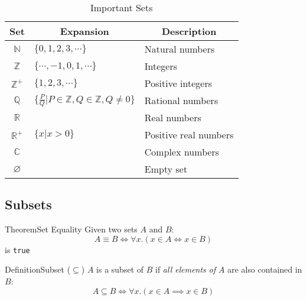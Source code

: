 \documentclass{MathNotes}
\newenvironment{definition}[1]{\begin{RedBox}{Definition}{#1}}{\end{RedBox}}
\newenvironment{theorem}[1]{\begin{GrayBox}{Theorem}{#1}}{\end{GrayBox}}
\begin{document}
\begin{table}[h!]\label{tab:important-sets}
	\centering
	\caption{Important Sets}
	\begin{tabular}{cll}
		\multicolumn{1}{c}{\textbf{Set}}                           &
		\multicolumn{1}{c}{\textbf{Expansion}}                     &
		\multicolumn{1}{c}{\textbf{Description}}                         \\
		\midrule
		$\mathbb{N}$                                               &
		$\{0, 1, 2, 3,\cdots\}$                                    &
		Natural numbers                                                  \\
		$\mathbb{Z}$                                               &
		$\{\cdots,-1,0, 1,\cdots\}$                                &
		Integers                                                         \\
		$\mathbb{Z}^+$                                             &
		$\{1, 2, 3,\cdots\}$                                       &
		Positive integers                                                \\
		$\mathbb{Q}$                                               &
		$\{\frac{P}{Q}\big|P\in\mathbb{Z},Q\in\mathbb{Z},Q\neq0\}$ &
		Rational numbers                                                 \\
		$\mathbb{R}$                                               &   &
		Real numbers                                                     \\
		$\mathbb{R}^+$                                             &
		$\{x\big|x>0\}$                                            &
		Positive real numbers                                            \\
		$\mathbb{C}$                                               &   &
		Complex numbers                                                  \\
		$\varnothing$                                              &   &
		Empty set                                                        \\
	\end{tabular}
\end{table}

\newpage
\subsection{Subsets}
\begin{multicols}{2}
	\begin{theorem}{Set Equality}\label{th:set-equality}
		Given two sets $A$ and $B$:\[A\equiv B\iff\forall x.(x\in A\iff x\in B)\] is \texttt{true}
	\end{theorem}

	\begin{definition}{Subset ($\subseteq$)}
		$A$ is a subset of $B$ if \textit{all elements of} $A$ are also contained in $B$:
		\[A\subseteq B\iff\forall x.(x\in A\implies x\in B)\]
	\end{definition}
\end{multicols}
\end{document}
